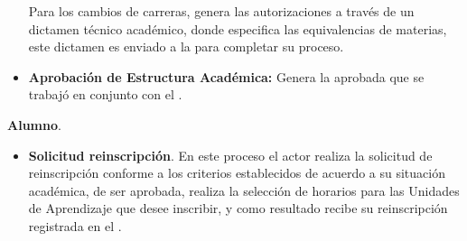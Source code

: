 \begin{ADescripcion}
\begin{itemize}
	Para los cambios de carreras, genera las autorizaciones a través de un dictamen técnico académico, donde especifica las equivalencias de materias, este dictamen es enviado a la  para completar su proceso.
	
	\item \textbf{Aprobación de Estructura Académica:} Genera la  aprobada que se trabajó en conjunto con el  . 
	\end{itemize}
	
	\item \textbf{Alumno}.
	
	\begin{itemize}
	\item \textbf{Solicitud reinscripción}. En este proceso el actor realiza la solicitud de reinscripción conforme a los criterios establecidos de acuerdo a su situación académica, de ser aprobada, realiza la selección de horarios para las Unidades de Aprendizaje que desee inscribir, y como resultado recibe su reinscripción registrada en el .
	\end{itemize}

\end{ADescripcion}

